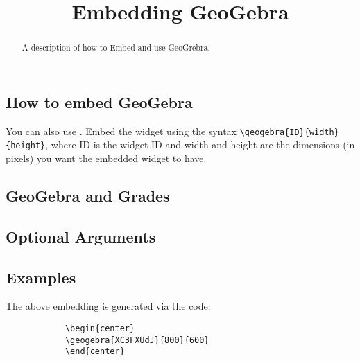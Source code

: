 \documentclass{ximera}
\title{Embedding GeoGebra}
\begin{document}
\begin{abstract}
    A description of how to Embed and use GeoGrebra.
\end{abstract}
\maketitle


    \subsection*{How to embed GeoGebra}

        You can also use . Embed the
        widget using the syntax \verb|\geogebra{ID}{width}{height}|, where ID
        is the widget ID and width and height are the dimensions (in pixels)
        you want the embedded widget to have.
        
        
    \subsection*{GeoGebra and Grades}
        
        

    \subsection*{Optional Arguments}
    
        

    \subsection*{Examples}
    
        \begin{center}
        \end{center}
        
        The above embedding is generated via the code:
        
        \begin{verbatim}
            \begin{center}
            \geogebra{XC3FXUdJ}{800}{600}
            \end{center}
        \end{verbatim}      
    
\end{document}
